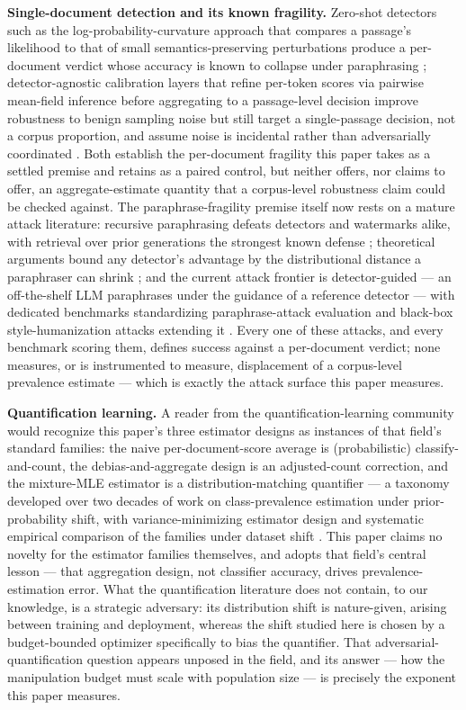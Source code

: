 \documentclass[11pt]{article}
\begin{document}
\textbf{Single-document detection and its known fragility.} Zero-shot detectors such as the log-probability-curvature approach that compares a passage's likelihood to that of small semantics-preserving perturbations produce a per-document verdict whose accuracy is known to collapse under paraphrasing \citep{DetectGPT}; detector-agnostic calibration layers that refine per-token scores via pairwise mean-field inference before aggregating to a passage-level decision improve robustness to benign sampling noise but still target a single-passage decision, not a corpus proportion, and assume noise is incidental rather than adversarially coordinated \citep{MarkovCalib}. Both establish the per-document fragility this paper takes as a settled premise and retains as a paired control, but neither offers, nor claims to offer, an aggregate-estimate quantity that a corpus-level robustness claim could be checked against. The paraphrase-fragility premise itself now rests on a mature attack literature: recursive paraphrasing defeats detectors and watermarks alike, with retrieval over prior generations the strongest known defense \citep{KrishnaParaphrase2023}; theoretical arguments bound any detector's advantage by the distributional distance a paraphraser can shrink \citep{Sadasivan2023}; and the current attack frontier is detector-guided --- an off-the-shelf LLM paraphrases under the guidance of a reference detector \citep{AdvParaphrase2025} --- with dedicated benchmarks standardizing paraphrase-attack evaluation \citep{PADBen2025} and black-box style-humanization attacks extending it \citep{MASH2026}. Every one of these attacks, and every benchmark scoring them, defines success against a per-document verdict; none measures, or is instrumented to measure, displacement of a corpus-level prevalence estimate --- which is exactly the attack surface this paper measures.

\textbf{Quantification learning.} A reader from the quantification-learning community would recognize this paper's three estimator designs as instances of that field's standard families: the naive per-document-score average is (probabilistic) classify-and-count, the debias-and-aggregate design is an adjusted-count correction, and the mixture-MLE estimator is a distribution-matching quantifier --- a taxonomy developed over two decades of work on class-prevalence estimation under prior-probability shift, with variance-minimizing estimator design \citep{QuantifierVariance2021} and systematic empirical comparison of the families under dataset shift \citep{QuantShift2023}. This paper claims no novelty for the estimator families themselves, and adopts that field's central lesson --- that aggregation design, not classifier accuracy, drives prevalence-estimation error. What the quantification literature does not contain, to our knowledge, is a strategic adversary: its distribution shift is nature-given, arising between training and deployment, whereas the shift studied here is chosen by a budget-bounded optimizer specifically to bias the quantifier. That adversarial-quantification question appears unposed in the field, and its answer --- how the manipulation budget must scale with population size --- is precisely the exponent this paper measures.
\end{document}
